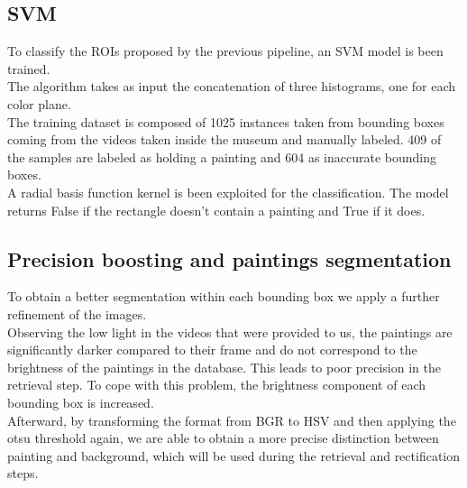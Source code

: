 \documentclass[conference]{IEEEtran}
\begin{document}
\subsection{SVM}
To classify the ROIs proposed by the previous pipeline, an SVM model is been trained.\\
The algorithm takes as input the concatenation of three histograms, one for each color plane.\\
The training dataset is composed of 1025 instances taken from bounding boxes coming from the videos taken inside the museum and manually labeled.
409 of the samples are labeled as holding a painting and 604 as inaccurate bounding boxes.\\
A radial basis function kernel is been exploited for the classification.
The model returns False if the rectangle doesn't contain a painting and True if it does.



\subsection{Precision boosting and paintings segmentation}
To obtain a better segmentation within each bounding box we apply a further refinement of the images.\\
Observing the low light in the videos that were provided to us, the paintings are significantly darker compared to their frame and do not correspond to the brightness of the paintings in the database. This leads to poor precision in the retrieval step. To cope with this problem, the brightness component of each bounding box is increased.\\
Afterward, by transforming the format from BGR to HSV and then applying the otsu threshold again, we are able to obtain a more precise distinction between painting and background, which will be used during the retrieval and rectification steps.\\
\end{document}
